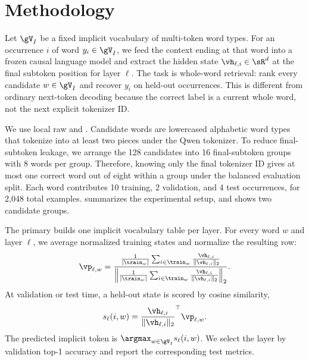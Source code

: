 \section{Methodology}
\label{sec:method}

Let $\gV_I$ be a fixed implicit vocabulary of multi-token word types. For an occurrence $i$ of word $y_i \in \gV_I$, we feed the context ending at that word into a frozen causal language model and extract the hidden state $\vh_{\ell,i}\in\sR^d$ at the final subtoken position for layer $\ell$. The task is whole-word retrieval: rank every candidate $w\in\gV_I$ and recover $y_i$ on held-out occurrences. This is different from ordinary next-token decoding because the correct label is a current whole word, not the next explicit tokenizer ID.

We use local raw \wikitext and \qwen. Candidate words are lowercased alphabetic word types that tokenize into at least two pieces under the Qwen tokenizer. To reduce final-subtoken leakage, we arrange the 128 candidates into 16 final-subtoken groups with 8 words per group. Therefore, knowing only the final tokenizer ID gives at most one correct word out of eight within a group under the balanced evaluation split. Each word contributes 10 training, 2 validation, and 4 test occurrences, for 2,048 total examples.  summarizes the experimental setup, and  shows two candidate groups.




The primary \itl builds one implicit vocabulary table per layer. For every word $w$ and layer $\ell$, we average normalized training states and normalize the resulting row:
\begin{equation}
    \vp_{\ell,w}
    =
    \frac{
        \frac{1}{|\train_w|}
        \sum_{i\in \train_w}
        \frac{\vh_{\ell,i}}{\|\vh_{\ell,i}\|_2}
    }{
        \left\|
        \frac{1}{|\train_w|}
        \sum_{i\in \train_w}
        \frac{\vh_{\ell,i}}{\|\vh_{\ell,i}\|_2}
        \right\|_2
    }.
\end{equation}
At validation or test time, a held-out state is scored by cosine similarity,
\begin{equation}
    s_\ell(i,w)=
    \frac{\vh_{\ell,i}}{\|\vh_{\ell,i}\|_2}^{\top}\vp_{\ell,w}.
\end{equation}
The predicted implicit token is $\argmax_{w\in\gV_I} s_\ell(i,w)$. We select the \itl layer by validation top-1 accuracy and report the corresponding test metrics.

